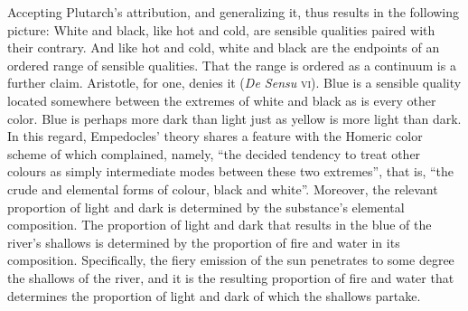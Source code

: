 Accepting Plutarch's attribution, and generalizing it, thus results in the following picture: White and black, like hot and cold, are sensible qualities paired with their contrary. And like hot and cold, white and black are the endpoints of an ordered range of sensible qualities. That the range is ordered as a continuum is a further claim. Aristotle, for one, denies it (\emph{De Sensu} \textsc{vi}). Blue is a sensible quality located somewhere between the extremes of white and black as is every other color. Blue is perhaps more dark than light just as yellow is more light than dark. In this regard, Empedocles' theory shares a feature with the Homeric color scheme of which \citet[458]{Gladstone:1858fk} complained, namely, ``the decided tendency to treat other colours as simply intermediate modes between these two extremes'', that is, ``the crude and elemental forms of colour, black and white''. Moreover, the relevant proportion of light and dark is determined by the substance's elemental composition. The proportion of light and dark that results in the blue of the river's shallows is determined by the proportion of fire and water in its composition. Specifically, the fiery emission of the sun penetrates to some degree the shallows of the river, and it is the resulting proportion of fire and water that determines the proportion of light and dark of which the shallows partake. 

